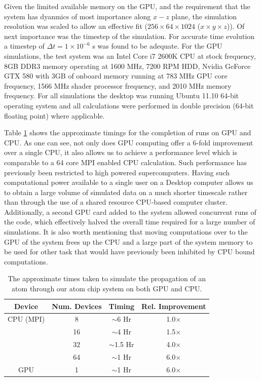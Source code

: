 Given the limited available memory on the GPU, and the requirement that the system has dyanmics of most importance along $x-z$ plane, the simulation resolution was scaled to allow an effective fit ($256\times 64\times1024$ ($x\times y\times z$)). Of next importance was the timestep of the simulation.  For accurate time evolution a timestep of $\Delta t = 1\times 10^{-6}$ s was found to be adequate. For the GPU simulations, the test system was an Intel Core i7 2600K CPU at stock frequency, 8GB DDR3 memory operating at 1600 MHz, 7200 RPM HDD, Nvidia GeForce GTX 580 with 3GB of onboard memory running at 783 MHz GPU core frequency, 1566 MHz shader processor frequency, and 2010 MHz memory frequency. For all simulations the desktop was running Ubuntu 11.10 64-bit operating system and all calculations were performed in double precision (64-bit floating point) where applicable.

Table \ref{tbl:timing} shows the approximate timings for the completion of runs on GPU and CPU. As one can see, not only does GPU computing offer a 6-fold improvement over a single CPU, it also allows us to achieve a performance level which is comparable to a 64 core MPI enabled CPU calculation. Such performance has previously been restricted to high powered supercomputers. Having such computational power available to a single user on a Desktop computer allows us to obtain a large volume of simulated data on a much shorter timescale rather than through the use of a shared resource CPU-based computer cluster. Additionally, a second GPU card added to the system allowed concurrent runs of the code, which effectively halved the overall time required for a large number of simulations. It is also worth mentioning that moving computations over to the GPU of the system frees up the CPU and a large part of the system memory to be used for other task that would have previously been inhibited by CPU bound computations.

\begin{table}[tb]
  \begin{center}
    \begin{tabular}{|c||c|c|c|}
      \hline
      Device & Num. Devices & Timing  & Rel. Improvement \\ \hline
      CPU (MPI) & 8 & $\sim$6 Hr & 1.0$\times$ \\
      & 16 & $\sim$4 Hr & 1.5$\times$ \\
      & 32 & $\sim$1.5 Hr & 4.0$\times$ \\
      & 64 & $\sim$1 Hr & 6.0$\times$ \\ \hline
      GPU & 1 & $\sim$1 Hr & 6.0$\times$ \\ \hline
    \end{tabular}
  \end{center}
   \caption{The approximate times taken to simulate the propagation of an atom through our atom chip system on both GPU and CPU.}
   \label{tbl:timing}
\end{table}


